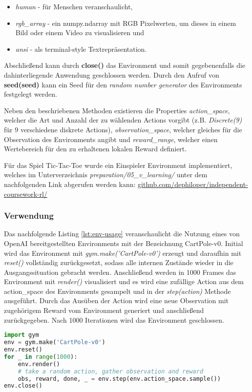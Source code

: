 \documentclass[11pt]{scrartcl}
\begin{document}
\begin{itemize}
\itemsep0pt
\item \textit{human} - für Menschen veranschaulicht, 
\item \textit{rgb\_array} - ein numpy.ndarray mit RGB Pixelwerten, um dieses in einem Bild oder einem 
Video zu visualisieren und 
\item \textit{ansi} - als terminal-style Textrepräsentation.
\end{itemize}
\noindent
Abschließend kann durch \textbf{close()} das Environment und somit gegebenenfalls die 
dahinterliegende Anwendung geschlossen werden. Durch den Aufruf von 
\textbf{seed(seed)} kann ein Seed für den \textit{random number generator}
des Environments festgelegt werden.


Neben den beschriebenen Methoden existieren die Properties \textit{action\_space}, welcher die
Art und Anzahl der zu wählenden Actions vorgibt (z.B. \textit{Discrete(9)} für 9 verschiedene
diskrete Actions), \textit{observation\_space}, welcher gleiches für die Observation des
Environments angibt und \textit{reward\_range}, welcher einen Wertebereich für den zu erhaltenen
lokalen Reward definiert.

Für das Spiel Tic-Tac-Toe wurde ein Einspieler Environment implementiert, welches im
Unterverzeichnis \textit{preparation/05\_v\_learning/} unter dem nachfolgenden Link abgerufen
werden kann: \url{github.com/dephiloper/independent-coursework-rl/}


\subsubsection{Verwendung}
Das nachfolgende Listing \autoref{lst:env-usage} veranschaulicht die Nutzung eines von OpenAI
bereitgestellten Environments mit der Bezeichnung CartPole-v0. Initial wird das Environment
mit \textit{gym.make('CartPole-v0')} erzeugt und daraufhin mit \textit{reset()} vollständig
zurückgesetzt, sodass alle internen Zustände wieder in die Ausgangssituation gebracht werden. 
Anschließend werden in 1000 Frames das Environment mit \textit{render()} visualisiert und es
wird eine zufällige Action aus dem action\_space des Environments gesampelt und in der
\textit{step(action)} Methode ausgeführt. Durch das Ausüben der Action wird eine neue
Observation mit zugehörigem Reward vom Environment generiert und anschließend zurückgegeben.
Nach 1000 Iterationen wird das Environment geschlossen. 
\begin{lstlisting}[language=Python, caption=environment usage, label=lst:env-usage]
import gym
env = gym.make('CartPole-v0')
env.reset()
for _ in range(1000):
    env.render()
    # take a random action, gather observation and reward
    obs, reward, done, _ = env.step(env.action_space.sample())
env.close()
\end{lstlisting}
\end{document}
